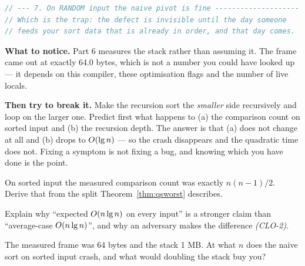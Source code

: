 \begin{lab}
\begin{lstlisting}[language=C++]
// --- 7. On RANDOM input the naive pivot is fine --------------------
// Which is the trap: the defect is invisible until the day someone
// feeds your sort data that is already in order, and that day comes.
\end{lstlisting}

\textbf{What to notice.} Part 6 measures the stack rather than assuming it. The
frame came out at exactly 64.0 bytes, which is not a number you could have
looked up --- it depends on this compiler, these optimisation flags and the
number of live locals.

\smallskip
\textbf{Then try to break it.} Make the recursion sort the \emph{smaller} side
recursively and loop on the larger one. Predict first what happens to (a) the
comparison count on sorted input and (b) the recursion depth. The answer is
that (a) does not change at all and (b) drops to $O(\operatorname{lg} n)$ --- so the
crash disappears and the quadratic time does not. Fixing a symptom is not
fixing a bug, and knowing which you have done is the point.
\end{lab}

\begin{checkpoint}
\begin{tightnum}
  \item On sorted input the measured comparison count was exactly $n(n-1)/2$.
        Derive that from the split Theorem~\ref{thm:qsworst} describes.
  \item Explain why ``expected $O(n\operatorname{lg} n)$ on every input'' is a stronger
        claim than ``average-case $O(n\operatorname{lg} n)$'', and why an adversary makes
        the difference \emph{(CLO-2)}.
  \item The measured frame was 64 bytes and the stack 1 MB. At what $n$ does
        the naive sort on sorted input crash, and what would doubling the stack
        buy you?
\end{tightnum}
\end{checkpoint}

